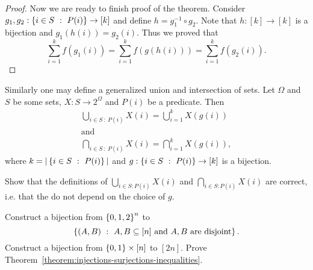 \begin{proof}
  Now we are ready to finish proof of the theorem.
  Consider $g_1, g_2 : \set[P(i)]{i \in S} \to [k]$ and define
  $h = g_1^{-1} \circ g_2$. Note that $h : [k] \to [k]$ is a bijection and
  $g_1(h(i)) = g_2(i)$. Thus we proved that
  \[
    \sum_{i = 1}^k f(g_1(i)) = \sum_{i = 1}^k f(g(h(i))) =
    \sum_{i = 1}^k f(g_2(i)).
  \]
\end{proof}

Similarly one may define a generalized union and intersection of sets.
Let $\Omega$ and $S$ be some sets, $X : S \to 2^\Omega$ and $P(i)$ be a
predicate. Then
\begin{gather*}
  \bigcup_{i \in S ~:~ P(i)} X(i) = \bigcup_{i = 1}^k X(g(i)) \\
  \text{and}\\
  \bigcap_{i \in S ~:~ P(i)} X(i) = \bigcap_{i = 1}^k X(g(i)),
\end{gather*}
where $k = |\set[P(i)]{i \in S}|$ and $g : \set[P(i)]{i \in S} \to [k]$ is a
bijection.

\begin{exercise}
  Show that the definitions of $\bigcup_{i \in S : P(i)} X(i)$ and
  $\bigcap_{i \in S : P(i)} X(i)$ are correct,
  i.e. that the do not depend on the choice of $g$.
\end{exercise}


\begin{exercises}
  \exercise Construct a bijection from $\set{0, 1, 2}^n$ to
    \[
      \set[{A, B \subseteq [n] \text{ and } A, B \text{ are disjoint}}]{(A, B)}.
    \]
  \exercise Construct a bijection from $\set{0, 1} \times [n]$ to $[2n]$.
  \exercise Prove Theorem~\ref{theorem:injections-surjections-inequalities}.
\end{exercises}
